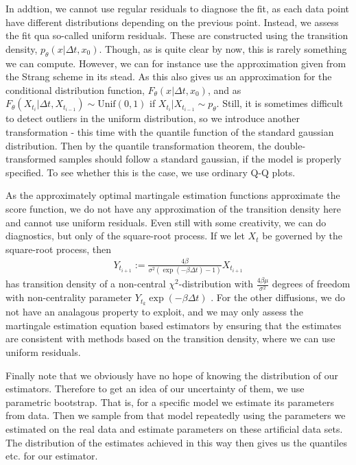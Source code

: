 In addtion, we cannot use regular residuals to diagnose the fit, as each data point have different distributions depending on the previous point. Instead, we assess the fit qua so-called uniform residuals. These are constructed using the transition density, $p_\theta(x|\Delta t, x_0)$. Though, as is quite clear by now, this is rarely something we can compute. However, we can for instance use the approximation given from the Strang scheme in its stead. As this also gives us an approximation for the conditional distribution function, $F_\theta(x|\Delta t, x_0)$, and as $F_\theta(X_{t_{i}}|\Delta t, X_{t_{i - 1}})\sim \mathrm{Unif}(0,1)$ if $X_{t_{i}}|X_{t_{i - 1}} \sim p_\theta$. Still, it is sometimes difficult to detect outliers in the uniform distribution, so we introduce another transformation - this time with the quantile function of the standard gaussian distribution. Then by the quantile transformation theorem, the double-transformed samples should follow a standard gaussian, if the model is properly specified. To see whether this is the case, we use ordinary Q-Q plots.

As the approximately optimal martingale estimation functions approximate the score function, we do not have any approximation of the transition density here and cannot use uniform residuals. Even still with some creativity, we can do diagnostics, but only of the square-root process. If we let $X_t$ be governed by the square-root process, then
\begin{align}
    Y_{t_{i + 1}} := \frac{4\beta}{\sigma^2\left(\exp\left(-\beta \Delta t\right) - 1\right)}X_{t_{i + 1}}
\end{align}
has transition density of a non-central $\chi^2$-distribution with $\frac{4\beta\mu}{\sigma^2}$ degrees of freedom with non-centrality parameter $Y_{t_k}\exp\left(-\beta \Delta t\right)$ \cite[Equation (5.68)]{Srkk2019}. For the other diffusions, we do not have an analagous property to exploit, and we may only assess the martingale estimation equation based estimators by ensuring that the estimates are consistent with methods based on the transition density, where we can use uniform residuals.

Finally note that we obviously have no hope of knowing the distribution of our estimators. Therefore to get an idea of our uncertainty of them, we use parametric bootstrap. That is, for a specific model we estimate its parameters from data. Then we sample from that model repeatedly using the parameters we estimated on the real data and estimate parameters on these artificial data sets. The distribution of the estimates achieved in this way then gives us the quantiles etc. for our estimator.